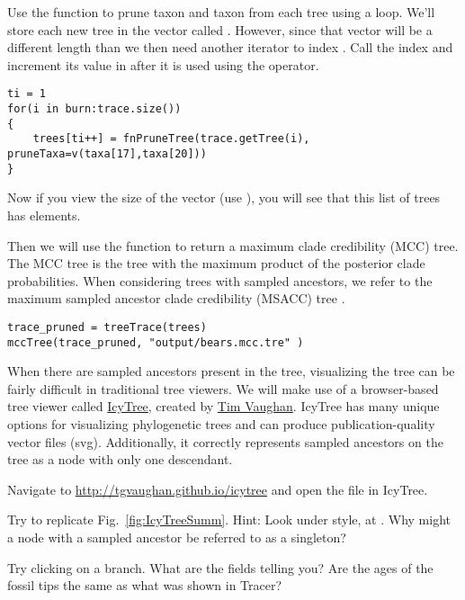 Use the  function to prune taxon  and taxon  from each tree using a  loop.
We'll store each new tree in the vector called .
However, since that vector will be a different length than  we then need another iterator to index .
Call the  index  and increment its value in after it is used using the \cl{++} operator.
{\tt \begin{snugshade*}
\begin{lstlisting}
ti = 1
for(i in burn:trace.size())
{
    trees[ti++] = fnPruneTree(trace.getTree(i), pruneTaxa=v(taxa[17],taxa[20]))
}
\end{lstlisting}
\end{snugshade*}}

Now if you view the size of the  vector (use ), you will see that this list of trees has  elements.

Then we will use the  function to return a maximum clade credibility (MCC) tree.
The MCC tree is the tree with the maximum product of the posterior clade probabilities.
When considering trees with sampled ancestors, we refer to the maximum sampled ancestor clade credibility (MSACC) tree \citep{Gavryushkina2016}.
{\tt \begin{snugshade*}
\begin{lstlisting}
trace_pruned = treeTrace(trees)
mccTree(trace_pruned, "output/bears.mcc.tre" )
\end{lstlisting}
\end{snugshade*}}


When there are sampled ancestors present in the tree, visualizing the tree can be fairly difficult in traditional tree viewers.
We will make use of a browser-based tree viewer called \href{http://tgvaughan.github.io/icytree/}{IcyTree}, created by \href{https://github.com/tgvaughan}{Tim Vaughan}.
IcyTree has many unique options for visualizing phylogenetic trees and can produce publication-quality vector files (\IE svg). 
Additionally, it correctly represents sampled ancestors on the tree as a node with only one descendant. 

{\begin{framed}
Navigate to \url{http://tgvaughan.github.io/icytree} and open the file  in IcyTree.

Try to replicate Fig.\ \ref{fig:IcyTreeSumm}. Hint: Look under style, at .
Why might a node with a sampled ancestor be referred to as a singleton?

Try clicking on a branch.
What are the fields telling you?
Are the ages of the fossil tips the same as what was shown in Tracer? 
\end{framed}}



